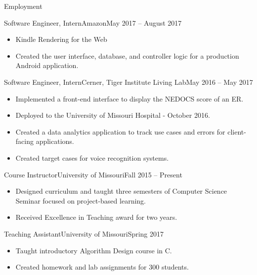 \documentclass[]{mcdowellcv}
\begin{document}
    \begin{cvsection}{Employment}
        \begin{cvsubsection}{Software Engineer, Intern}{Amazon}{May 2017 -- August 2017}
            \begin{itemize}
            \item Kindle Rendering for the Web
            \item Created the user interface, database, and controller logic for a production Android application.
            \end{itemize}
        \end{cvsubsection}

        \begin{cvsubsection}{Software Engineer, Intern}{Cerner, Tiger Institute Living Lab}{May 2016 -- May 2017}		
            \begin{itemize}
                \item Implemented a front-end interface to display the NEDOCS score of an ER.
                \item Deployed to the University of Missouri Hospital - October 2016.
                \item Created a data analytics application to track use cases and errors for client-facing applications.
                \item Created target cases for voice recognition systems.
            \end{itemize}
        \end{cvsubsection}
        
        \begin{cvsubsection}{Course Instructor}{University of Missouri}{Fall 2015 -- Present}
            \begin{itemize}
                \item Designed curriculum and taught three semesters of Computer Science Seminar focused on project-based learning.
                \item Received Excellence in Teaching award for two years.
            \end{itemize}
        \end{cvsubsection}
        
        \begin{cvsubsection}{Teaching Assistant}{University of Missouri}{Spring 2017}
            \begin{itemize}
                \item Taught introductory Algorithm Design course in C.
                \item Created homework and lab assignments for 300 students.
            \end{itemize}
        \end{cvsubsection}

    \end{cvsection}	
    
\end{document}
